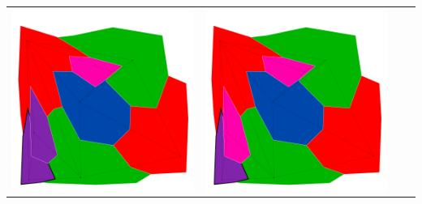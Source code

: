 \documentclass[10pt,a4paper]{article}
\begin{document}
\begin{tabular}{c c c c }
	\includegraphics[scale=.10]{../results/backtracking_forward/map_build/bt_forward_I00011.pdf}&
	\includegraphics[scale=.10]{../results/backtracking_forward/map_build/bt_forward_I00012.pdf}\\
	

\end{tabular}
\end{document}
